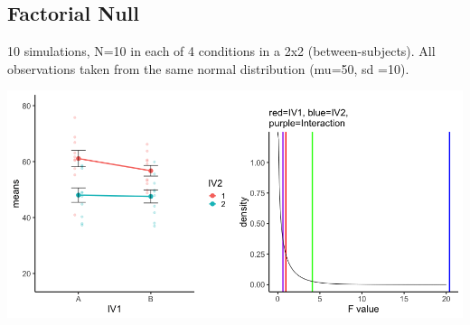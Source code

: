 \documentclass[
]{book}
\begin{document}
\hypertarget{factorial-null}{%
\subsection{Factorial Null}\label{factorial-null}}

10 simulations, N=10 in each of 4 conditions in a 2x2 (between-subjects). All observations taken from the same normal distribution (mu=50, sd =10).

\includegraphics{gifs/FactorialNull.gif}
\end{document}
